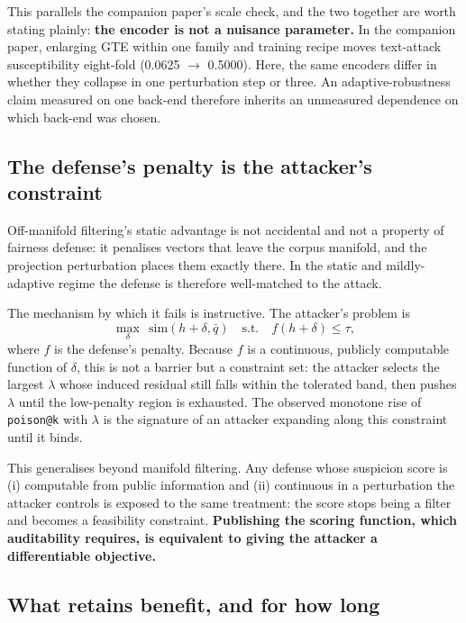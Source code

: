\documentclass[review,3p,times]{elsarticle}
\begin{document}
This parallels the companion paper's scale check, and the two together are worth stating plainly: \textbf{the encoder is not a nuisance parameter.} In the companion paper, enlarging GTE within one family and training recipe moves text-attack susceptibility eight-fold (0.0625 \(\rightarrow\) 0.5000). Here, the same encoders differ in whether they collapse in one perturbation step or three. An adaptive-robustness claim measured on one back-end therefore inherits an unmeasured dependence on which back-end was chosen.

\subsection{The defense's penalty is the attacker's constraint}\label{the-defenses-penalty-is-the-attackers-constraint}

Off-manifold filtering's static advantage is not accidental and not a property of fairness defense: it penalises vectors that leave the corpus manifold, and the projection perturbation places them exactly there. In the static and mildly-adaptive regime the defense is therefore well-matched to the attack.

The mechanism by which it fails is instructive. The attacker's problem is
\[\max_{\delta}\ \ \mathrm{sim}(h + \delta, \bar{q}) \quad \text{s.t.} \quad f(h + \delta) \le \tau,\]
where \(f\) is the defense's penalty. Because \(f\) is a continuous, publicly computable function of \(\delta\), this is not a barrier but a constraint set: the attacker selects the largest \(\lambda\) whose induced residual still falls within the tolerated band, then pushes \(\lambda\) until the low-penalty region is exhausted. The observed monotone rise of \texttt{poison@k} with \(\lambda\) is the signature of an attacker expanding along this constraint until it binds.

This generalises beyond manifold filtering. Any defense whose suspicion score is (i) computable from public information and (ii) continuous in a perturbation the attacker controls is exposed to the same treatment: the score stops being a filter and becomes a feasibility constraint. \textbf{Publishing the scoring function, which auditability requires, is equivalent to giving the attacker a differentiable objective.}

\subsection{What retains benefit, and for how long}\label{what-retains-benefit-and-for-how-long}
\end{document}
